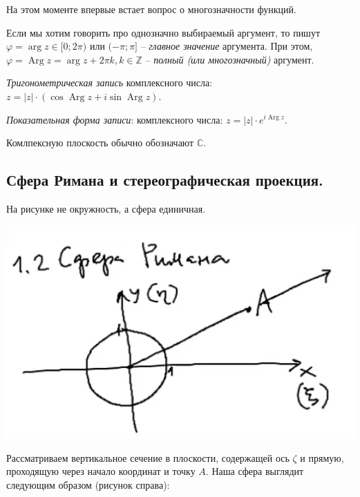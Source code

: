   На этом моменте впервые встает вопрос о многозначности  функций.
  
  \begin{definition*}
  Если мы хотим говорить про однозначно выбираемый аргумент, то пишут $\varphi = \operatorname{arg} z \in [0; 2\pi)$ или $(-\pi; \pi]$ --\textit{ главное значение} аргумента. При этом,  $\varphi = \operatorname{Arg}z =\operatorname{arg} z + 2\pi k,k \in \mathbb{Z}$ -- \textit{полный (или многозначный)}  аргумент.
  \end{definition*}

  \begin{definition*}
  \textit{Тригонометрическая запись}  комплексного числа: $z = |z| \cdot (\cos \operatorname{Arg}z + i \sin \operatorname{Arg}z)$.
  \end{definition*}

  \begin{definition*}
  \textit{Показательная форма записи}:  комплексного числа: $z = |z| \cdot e^{i\operatorname{Arg}z}$.
  \end{definition*}

  Комлпексную плоскость обычно обозначают $\mathbb{C}$.

\subsection*{Сфера Римана и стереографическая проекция.}
На рисунке не окружность,  а сфера единичная. 

\includegraphics[scale=0.7]{img/2.png}

Рассматриваем вертикальное сечение в плоскости, содержащей ось $\zeta$ и прямую, проходящую через начало координат и точку $A$. Наша сфера выглядит следующим образом (рисунок справа):


